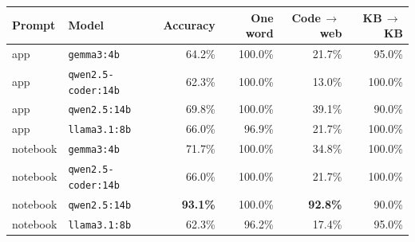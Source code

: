 \begin{tabular}{llrrrr}
\hline
Prompt & Model & Accuracy & One word & Code\,$\to$\,web & KB\,$\to$\,KB \\
\hline
app & \texttt{gemma3:4b} & 64.2\% & 100.0\% & 21.7\% & 95.0\% \\
app & \texttt{qwen2.5-coder:14b} & 62.3\% & 100.0\% & 13.0\% & 100.0\% \\
app & \texttt{qwen2.5:14b} & 69.8\% & 100.0\% & 39.1\% & 90.0\% \\
app & \texttt{llama3.1:8b} & 66.0\% & 96.9\% & 21.7\% & 100.0\% \\
notebook & \texttt{gemma3:4b} & 71.7\% & 100.0\% & 34.8\% & 100.0\% \\
notebook & \texttt{qwen2.5-coder:14b} & 66.0\% & 100.0\% & 21.7\% & 100.0\% \\
notebook & \texttt{qwen2.5:14b} & \textbf{93.1\%} & 100.0\% & \textbf{92.8\%} & 90.0\% \\
notebook & \texttt{llama3.1:8b} & 62.3\% & 96.2\% & 17.4\% & 95.0\% \\
\hline
\end{tabular}
